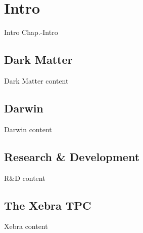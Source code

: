 \chapter{Intro}
\label{chap:Intro}

Intro Chap.-Intro

\section{Dark Matter}
\label{sec:DarkMatter}

Dark Matter content




\section{Darwin}
\label{sec:Darwin}

Darwin content



\section{Research \& Development}
\label{sec:RnD}

R\&D content


\section{The Xebra TPC}
\label{sec:Xebra}

Xebra content


